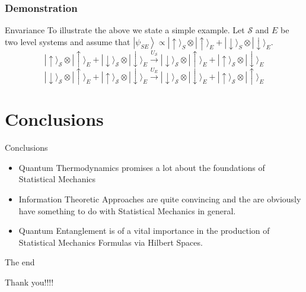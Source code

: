 \documentclass[handout]{beamer}
\begin{document}
\subsubsection{Demonstration}

\begin{frame}{Envariance}
To illustrate the above we state a simple example. Let $\mathcal{S}$ and $E$ be two level systems and assume that $\left|\psi_{SE}\right\rangle \propto|\uparrow\rangle_{S} \otimes|\uparrow\rangle_{E}+|\downarrow\rangle_{S} \otimes|\downarrow\rangle_{E}$. 
\begin{equation}
|\uparrow\rangle_{\mathcal{S}} \otimes|\uparrow\rangle_{E}+|\downarrow\rangle_{\mathcal{S}} \otimes|\downarrow\rangle_{E} \stackrel{U_{\mathcal{S}}}{\longrightarrow}|\downarrow\rangle_{\mathcal{S}} \otimes|\uparrow\rangle_{E}+|\uparrow\rangle_{\mathcal{S}} \otimes|\downarrow\rangle_{E}
\end{equation}
\begin{equation}
|\downarrow\rangle_{\mathcal{S}} \otimes|\uparrow\rangle_{E}+|\uparrow\rangle_{\mathcal{S}} \otimes|\downarrow\rangle_{E} \stackrel{U_{E}}{\longrightarrow}|\downarrow\rangle_{\mathcal{S}} \otimes|\downarrow\rangle_{E}+|\uparrow\rangle_{\mathcal{S}} \otimes|\uparrow\rangle_{E}
\end{equation}
\end{frame}
\section{Conclusions}
\begin{frame}{Conclusions}
\begin{itemize}
\item Quantum Thermodynamics promises a lot about the foundations of Statistical Mechanics
\item Information Theoretic Approaches are quite convincing and the are obviously have something to do with Statistical Mechanics in general.
\item Quantum Entanglement is of a vital importance in the production of Statistical Mechanics Formulas via Hilbert Spaces.
\end{itemize}
\end{frame}
\begin{frame}{The end}
\begin{center}
\Huge Thank you!!!!
\end{center}
\end{frame}
\end{document}
